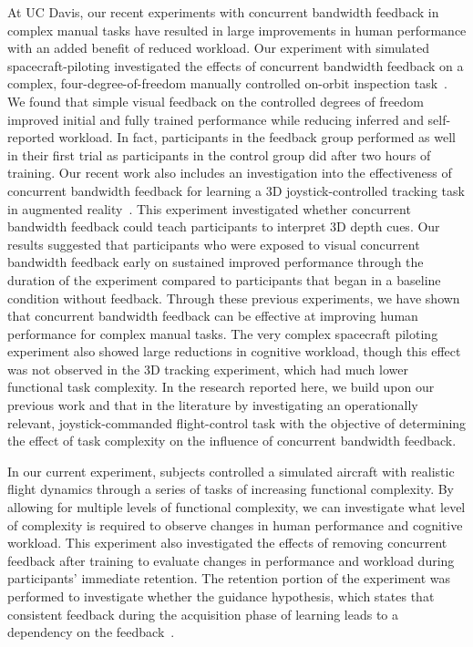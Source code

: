 At UC Davis, our recent experiments with concurrent bandwidth feedback in complex manual tasks have resulted in large improvements in human performance with an added benefit of reduced workload.
Our experiment with simulated spacecraft-piloting investigated the effects of concurrent bandwidth feedback on a complex, four-degree-of-freedom manually controlled on-orbit inspection task~\citep{karasinski_real-time_2017}.
We found that simple visual feedback on the controlled degrees of freedom improved initial and fully trained performance while reducing inferred and self-reported workload.
In fact, participants in the feedback group performed as well in their first trial as participants in the control group did after two hours of training.
Our recent work also includes an investigation into the effectiveness of concurrent bandwidth feedback for learning a 3D joystick-controlled tracking task in augmented reality~\citep{karasinski_evaluating_2019}.
This experiment investigated whether concurrent bandwidth feedback could teach participants to interpret 3D depth cues.
Our results suggested that participants who were exposed to visual concurrent bandwidth feedback early on sustained improved performance through the duration of the experiment compared to participants that began in a baseline condition without feedback.
Through these previous experiments, we have shown that concurrent bandwidth feedback can be effective at improving human performance for complex manual tasks.
The very complex spacecraft piloting experiment also showed large reductions in cognitive workload, though this effect was not observed in the 3D tracking experiment, which had much lower functional task complexity.
In the research reported here, we build upon our previous work and that in the literature by investigating an operationally relevant, joystick-commanded flight-control task with the objective of determining the effect of task complexity on the influence of concurrent bandwidth feedback.

In our current experiment, subjects controlled a simulated aircraft with realistic flight dynamics through a series of tasks of increasing functional complexity.
By allowing for multiple levels of functional complexity, we can investigate what level of complexity is required to observe changes in human performance and cognitive workload.
This experiment also investigated the effects of removing concurrent feedback after training to evaluate changes in performance and workload during participants' immediate retention.
The retention portion of the experiment was performed to investigate whether the guidance hypothesis, which states that consistent feedback during the acquisition phase of learning leads to a dependency on the feedback~\citep{salmoni_knowledge_1984}.

